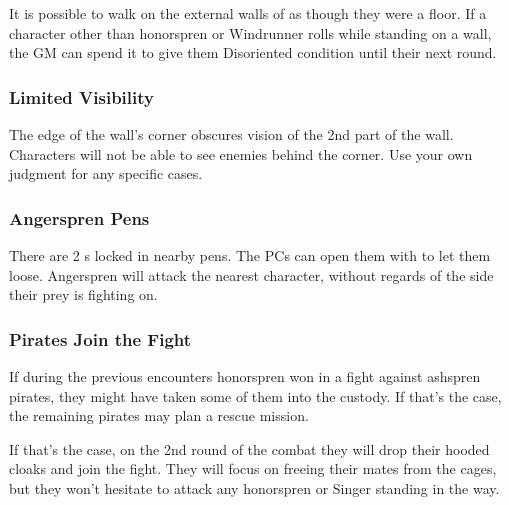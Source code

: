 It is possible to walk on the external walls of \locationFidelity{} as though they were a floor. If a character other than honorspren or Windrunner rolls \iconComp{} while standing on a wall, the GM can spend it to give them Disoriented condition until their next round.


\subsubsection{Limited Visibility}

The edge of the wall's corner obscures vision of the 2nd part of the wall. Characters will not be able to see enemies behind the corner. Use your own judgment for any specific cases.

\subsubsection{Angerspren Pens}

There are 2 \enemyAngerSpren{}s locked in nearby pens. The PCs can open them with  to let them loose. Angerspren will attack the nearest character, without regards of the side their prey is fighting on.

\subsubsection{Pirates Join the Fight}

If during the previous encounters honorspren won in a fight against ashspren pirates, they might have taken some of them into the custody. If that's the case, the remaining pirates may plan a rescue mission. 

If that's the case, on the 2nd round of the combat they will drop their hooded cloaks and join the fight. They will focus on freeing their mates from the cages, but they won't hesitate to attack any honorspren or Singer standing in the way.



